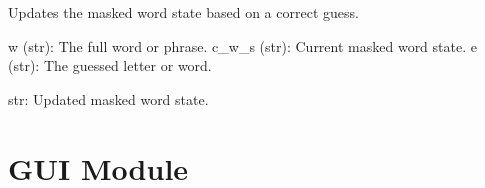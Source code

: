 \documentclass[letterpaper,10pt,english]{sphinxmanual}
\begin{document}

\begin{fulllineitems}
\label{\detokenize{modules:Game_Logic.update_word_state}}
\pysigstartsignatures
{}
\pysigstopsignatures
\sphinxAtStartPar
Updates the masked word state based on a correct guess.
\begin{description}
\sphinxAtStartPar
w (str): The full word or phrase.
c\_w\_s (str): Current masked word state.
e (str): The guessed letter or word.

\sphinxAtStartPar
str: Updated masked word state.

\end{description}

\end{fulllineitems}



\chapter{GUI Module}
\label{\detokenize{modules:module-GUI}}\label{\detokenize{modules:gui-module}}
\end{document}
